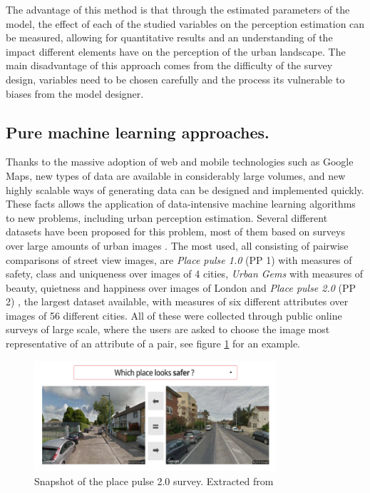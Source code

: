 The advantage of this method is that through the estimated parameters of the model, the effect
of each of the studied variables on the perception estimation can be measured, allowing for
quantitative results and an understanding of the impact different elements have on the
perception of the urban landscape. The main disadvantage of this approach comes from the
difficulty of the  survey design, variables need to be chosen carefully and the process its
vulnerable to biases from the model designer.

\subsection{Pure machine learning approaches.}

Thanks to the massive adoption of web and mobile technologies such as Google Maps, new types of
data are available in considerably large volumes, and new highly scalable ways of  generating data can be
designed and implemented quickly. These facts allows the application of data-intensive
machine learning algorithms to new  problems, including urban perception estimation. Several different
datasets have been proposed for this problem, most of them based on surveys over large amounts of urban images
\cite{hidalgo_inequality, hidalgo_placepulse, quercia_aesthetic, liu_machine, santani}. The most used,
all consisting of pairwise comparisons of street view images, are \textit{Place pulse 1.0} (PP 1) \cite{hidalgo_inequality}
with measures of safety, class and uniqueness over images of 4 cities, \textit{Urban Gems} with measures of
beauty, quietness and happiness over images of London and \textit{Place pulse 2.0} (PP 2) \cite{hidalgo_placepulse}, the largest dataset
available, with measures of six different attributes over images of 56 different cities. All of these were collected
through public online surveys of large scale, where the users
are asked to choose the image most representative of an attribute of a pair, see figure \ref{fig:survey} for an example.

\begin{figure}[ht]
	\begin{center}
	\includegraphics[width=0.8\textwidth]{./figures/placepulse.png}
	\caption[Place pulse 2.0 survey]{Snapshot of the place pulse 2.0 survey. Extracted from  }
	\label{fig:survey}
	\end{center}
\end{figure}

